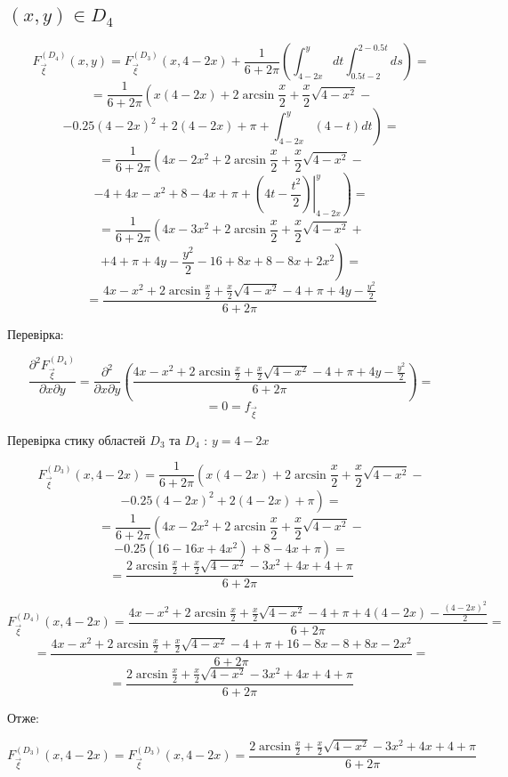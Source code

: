 \documentclass[14pt, a4paper, ukrainian]{extreport}
\begin{document}
	\subsection{$(x, y) \in D_4 $}
	
	$$ F_{\vec \xi}^{\left(D_4\right)}(x, y) = F_{\vec \xi}^{\left(D_3\right)}(x, 4 - 2x) + \frac{1}{6+2\pi}\left(\int_{4-2x}^{y}dt\int_{0.5t - 2}^{2 - 0.5t}ds \right)= 
	$$
	$$ = \frac{1}{6+2\pi}\left(x(4-2x) + 2\arcsin\frac{x}{2} + \frac{x}{2}\sqrt{4-x^2} -  \right.
	$$
	$$ - 0.25(4-2x)^2 + 2(4-2x) + \left. \pi + \int_{4-2x}^{y}(4-t)dt\right) = 
	$$
	$$ = \frac{1}{6+2\pi}\left(4x - 2x^2 + 2\arcsin\frac{x}{2} + \frac{x}{2}\sqrt{4-x^2} -  \right.
	$$
	$$ - 4 + 4x -x^2 + 8-4x + \left. \pi + \left.\left(4t - \frac{t^2}{2}\right)\right|_{4-2x}^{y}\right) = 
	$$
	$$ = \frac{1}{6+2\pi}\left(4x - 3x^2 + 2\arcsin\frac{x}{2} + \frac{x}{2}\sqrt{4-x^2} +  \right.
	$$
	$$ + \left. 4 + \pi + 4y - \frac{y^2}{2} - 16 + 8x + 8 - 8x + 2x^2\right) = 
	$$
	$$ = \frac{4x -x^2 + 2\arcsin\frac{x}{2} + \frac{x}{2}\sqrt{4-x^2} - 4 + \pi + 4y - \frac{y^2}{2}}{6+2\pi} 
	$$
	
	Перевірка:
	
	$$\frac{\partial^2F_{\vec\xi}^{\left(D_4\right)}}{\partial x \partial y} = \frac{\partial^2}{\partial x \partial y}\left(\frac{4x - x^2 + 2\arcsin\frac{x}{2} + \frac{x}{2}\sqrt{4-x^2} - 4 + \pi + 4y - \frac{y^2}{2}}{6+2\pi}\right) = 
	$$
	$$ = 0 = f_{\vec\xi}
	$$
	
	Перевірка стику областей $D_3$ та $D_4$ : $ y = 4 - 2x$
	
	$$ F_{\vec\xi}^{\left({D_3}\right)}(x, 4 - 2x) = \frac{1}{6+2\pi} \left(x(4-2x) + 2\arcsin\frac{x}{2} + \frac{x}{2}\sqrt{4-x^2} -\right.
	$$
	$$ \left. - 0.25(4 - 2x)^2 + 2(4 - 2x) + \pi\right) =
	$$
	$$ = \frac{1}{6+2\pi} \left(4x - 2x^2 + 2\arcsin\frac{x}{2} + \frac{x}{2}\sqrt{4-x^2} -\right.
	$$
	$$ \left. - 0.25(16 - 16x + 4x^2) + 8 - 4x + \pi\right) =
	$$ 
	$$= \frac{2\arcsin\frac{x}{2} + \frac{x}{2}\sqrt{4-x^2} - 3x^2 + 4x + 4 + \pi}{6+2\pi}
	$$ 
	
	$$ F_{\vec\xi}^{\left({D_4}\right)}(x, 4 - 2x) = \frac{4x -x^2 + 2\arcsin\frac{x}{2} + \frac{x}{2}\sqrt{4-x^2} - 4 + \pi + 4(4-2x) - \frac{(4-2x)^2}{2}}{6+2\pi} = 
	$$
	$$ = \frac{4x -x^2 + 2\arcsin\frac{x}{2} + \frac{x}{2}\sqrt{4-x^2} - 4 + \pi + 16 -8x - 8 + 8x - 2x^2}{6+2\pi} = 
	$$ 
	$$ = \frac{2\arcsin\frac{x}{2} + \frac{x}{2}\sqrt{4-x^2} - 3x^2 + 4x + 4 + \pi}{6+2\pi}
	$$ 
	
	Отже:
	
	$$  F_{\vec\xi}^{\left({D_3}\right)}(x, 4-2x) =  F_{\vec\xi}^{\left({D_3}\right)}(x, 4-2x) = \frac{2\arcsin\frac{x}{2} + \frac{x}{2}\sqrt{4-x^2} - 3x^2 + 4x + 4 + \pi}{6+2\pi}
	$$
	
\end{document}
